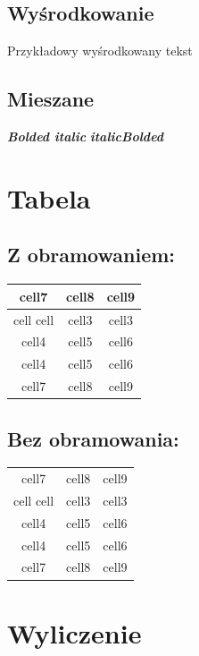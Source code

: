 \documentclass{report}
\begin{document}
        \subsection{Wyśrodkowanie}
            \centerline{Przykładowy wyśrodkowany tekst}

        \subsection{Mieszane}
            \textbf{\textit{Bolded italic}}
            \newline
            \textit{\textbf{italicBolded}}

    \section{Tabela}
        \subsection{Z obramowaniem:}
            \begin{tabular}{| c | c | c |}
                \hline
                cell7 & cell8 & cell9\\
                \hline
                cell cell & cell3 & cell3 \\
                \hline
                cell4 & cell5 & cell6 \\
                \hline
                cell4 & cell5 & cell6 \\
                \hline
                cell7 & cell8 & cell9
            \end{tabular}

        \subsection{Bez obramowania:}
            \begin{tabular}{c c c}
                cell7 & cell8 & cell9\\
                cell cell & cell3 & cell3 \\
                cell4 & cell5 & cell6 \\
                cell4 & cell5 & cell6 \\
                cell7 & cell8 & cell9  
            \end{tabular}

    \section{Wyliczenie}
\end{document}
